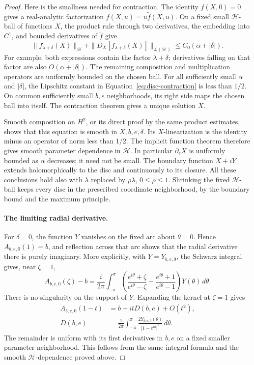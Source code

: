 \begin{proof}
Here is the smallness needed for contraction.  The identity $f(X,0)=0$
gives a real-analytic factorization $f(X,u)=u\widetilde f(X,u)$.  On a fixed small
$\mathcal H$-ball of functions $X$, the product rule through two
derivatives, the embedding into $C^1$, and bounded derivatives of $\widetilde f$
give
\begin{equation}\label{eq:disc-composition-bound}
 \|f_{\lambda+\delta}(X)\|_{\mathcal H}
 +\|D_X[f_{\lambda+\delta}(X)]\|_{\mathcal L(\mathcal H)}
 \le C_0(\alpha+|\delta|).
\end{equation}
For example, both expressions contain the factor $\lambda+\delta$;
derivatives falling on that factor are also $O(\alpha+|\delta|)$.
The remaining composition and multiplication operators are uniformly
bounded on the chosen ball.  For all sufficiently small $\alpha$ and
$|\delta|$, the Lipschitz constant in
Equation~\eqref{eq:disc-contraction} is less than $1/2$.  On common
sufficiently small $b,e$ neighborhoods, its right side maps the chosen
ball into itself.  The
contraction theorem gives a unique solution $X$.

Smooth composition on $H^2$, or its direct proof by the same product
estimates, shows that this equation is smooth in $X,b,e,\delta$.
Its $X$-linearization is the identity minus an operator of norm less
than $1/2$.  The implicit function theorem therefore gives smooth
parameter dependence in $\mathcal H$.  In particular $\partial_e X$
is uniformly bounded as $\alpha$ decreases; it need not be small.
The boundary function $X+iY$ extends holomorphically to the disc and
continuously to its closure.  All these conclusions hold also with
$\lambda$ replaced by $\rho\lambda$, $0\le\rho\le1$.  Shrinking the
fixed $\mathcal H$-ball keeps every disc in the prescribed coordinate
neighborhood, by the boundary bound and the maximum principle.

\paragraph{The limiting radial derivative.}
For $\delta=0$, the function $Y$ vanishes on the fixed arc about
$\theta=0$.  Hence $A_{b,e,0}(1)=b$, and reflection across that arc
shows that the radial derivative there is purely imaginary.  More
explicitly, with $Y=Y_{b,e,0}$, the Schwarz integral gives, near $\zeta=1$,
\[
 A_{b,e,0}(\zeta)-b
 =\frac{i}{2\pi}\int_{-\pi}^{\pi}
 \left(\frac{e^{i\theta}+\zeta}{e^{i\theta}-\zeta}
       -\frac{e^{i\theta}+1}{e^{i\theta}-1}\right)
 Y(\theta)\,d\theta.
\]
There is no singularity on the support of $Y$.  Expanding the kernel
at $\zeta=1$ gives
\begin{align}
 A_{b,e,0}(1-t)
   &=b+i t D(b,e)+O(t^2),\label{eq:disc-radial}\\
 D(b,e)
   &=\frac{1}{2\pi}\int_{-\pi}^{\pi}
        \frac{2Y_{b,e,0}(\theta)}{|1-e^{i\theta}|^2}\,d\theta.
        \label{eq:disc-normal-derivative}
\end{align}
The remainder is uniform with its first derivatives in $b,e$ on a
fixed smaller parameter neighborhood.  This follows from the same
integral formula and the smooth $\mathcal H$-dependence proved above.


\end{proof}

